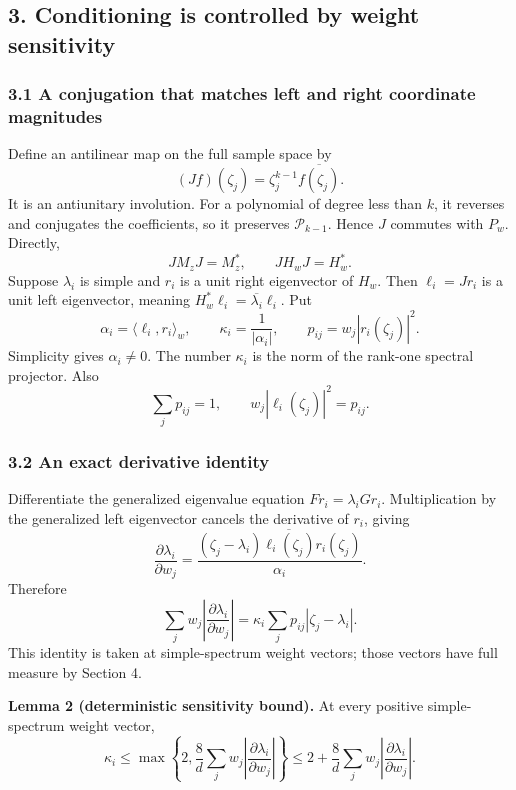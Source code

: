 \documentclass[
  11pt,
]{article}
\begin{document}
\subsection{3. Conditioning is controlled by weight
sensitivity}\label{conditioning-is-controlled-by-weight-sensitivity}

\subsubsection{3.1 A conjugation that matches left and right coordinate
magnitudes}\label{a-conjugation-that-matches-left-and-right-coordinate-magnitudes}

Define an antilinear map on the full sample space by \[
(Jf)(\zeta_j)=\zeta_j^{k-1}\overline{f(\zeta_j)}.
\] It is an antiunitary involution. For a polynomial of degree less than
\(k\), it reverses and conjugates the coefficients, so it preserves
\(\mathcal P_{k-1}\). Hence \(J\) commutes with \(P_w\). Directly, \[
JM_zJ=M_z^*,\qquad JH_wJ=H_w^*. \tag{4}
\] Suppose \(\lambda_i\) is simple and \(r_i\) is a unit right
eigenvector of \(H_w\). Then \(\ell_i=Jr_i\) is a unit left eigenvector,
meaning \(H_w^*\ell_i=\overline{\lambda_i}\ell_i\). Put \[
\alpha_i=\langle\ell_i,r_i\rangle_w,\qquad
\kappa_i=\frac{1}{|\alpha_i|},\qquad
p_{ij}=w_j|r_i(\zeta_j)|^2.
\] Simplicity gives \(\alpha_i\ne0\). The number \(\kappa_i\) is the
norm of the rank-one spectral projector. Also \[
\sum_jp_{ij}=1,\qquad
w_j|\ell_i(\zeta_j)|^2=p_{ij}. \tag{5}
\]

\subsubsection{3.2 An exact derivative
identity}\label{an-exact-derivative-identity}

Differentiate the generalized eigenvalue equation
\(Fr_i=\lambda_iGr_i\). Multiplication by the generalized left
eigenvector cancels the derivative of \(r_i\), giving \[
\frac{\partial\lambda_i}{\partial w_j}
=\frac{(\zeta_j-\lambda_i)\overline{\ell_i(\zeta_j)}r_i(\zeta_j)}{\alpha_i}.
\] Therefore \[
\sum_jw_j\left|\frac{\partial\lambda_i}{\partial w_j}\right|
=\kappa_i\sum_jp_{ij}|\zeta_j-\lambda_i|. \tag{6}
\] This identity is taken at simple-spectrum weight vectors; those
vectors have full measure by Section 4.

\textbf{Lemma 2 (deterministic sensitivity bound).} At every positive
simple-spectrum weight vector, \[
\kappa_i\leq
\max\left\{2,\frac8d\sum_jw_j\left|\frac{\partial\lambda_i}{\partial w_j}\right|\right\}
\leq2+\frac8d\sum_jw_j\left|\frac{\partial\lambda_i}{\partial w_j}\right|. \tag{7}
\]
\end{document}
